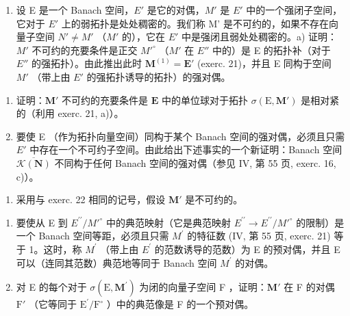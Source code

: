 \begin{enumerate}
\def\labelenumi{\arabic{enumi})}
\setcounter{enumi}{21}
\tightlist
\item
  设 E 是一个 Banach 空间，\(E'\) 是它的对偶，\(M'\) 是 \(E'\) 中的一个强闭子空间，它对于 \(E'\) 上的弱拓扑是处处稠密的。我们称 M' 是不可约的，如果不存在向量子空间 \(N' \neq M'\) （\(M'\) 的），它在 \(E'\) 中是强闭且弱处处稠密的。a) 证明：\(M'\) 不可约的充要条件是正交 \(M'^{\circ}\) （\(M'\) 在 \(E''\) 中的）是 E 的拓扑补（对于 \(E''\) 的强拓扑）。由此推出此时 \(\mathbf{M}^{(1)} = \mathbf{E}'\) (exerc. 21)，并且 E 同构于空间 \(M'\) （带上由 \(E'\) 的强拓扑诱导的拓扑）的强对偶。
\end{enumerate}

\begin{enumerate}
\def\labelenumi{\alph{enumi})}
\setcounter{enumi}{1}
\item
  证明：\(\mathbf{M}'\) 不可约的充要条件是 \(\mathbf{E}\) 中的单位球对于拓扑 \(\sigma (\mathrm{E},\mathbf{M}')\) 是相对紧的（利用 exerc. 21, a)）。
\item
  要使 E （作为拓扑向量空间）同构于某个 Banach 空间的强对偶，必须且只需 \(E'\) 中存在一个不可约子空间。由此给出下述事实的一个新证明：Banach 空间 \(\overline{\mathcal{K}(\mathbf{N})}\) 不同构于任何 Banach 空间的强对偶（参见 IV, 第 55 页, exerc. 16, c)）。
\end{enumerate}

\begin{enumerate}
\def\labelenumi{\arabic{enumi})}
\setcounter{enumi}{22}
\tightlist
\item
  采用与 exerc. 22 相同的记号，假设 \(\mathbf{M}'\) 是不可约的。
\end{enumerate}

\begin{enumerate}
\def\labelenumi{\alph{enumi})}
\item
  要使从 E 到 \(E^{\prime\prime}/M'^{\circ}\) 中的典范映射（它是典范映射 \(E^{\prime\prime} \rightarrow E^{\prime\prime}/M'^{\circ}\) 的限制）是一个 Banach 空间等距，必须且只需 \(M^{\prime}\) 的特征数 (IV, 第 55 页, exerc. 21) 等于 1。这时，称 \(M^{\prime}\) （带上由 \(E^{\prime}\) 的范数诱导的范数）为 E 的预对偶，并且 E 可以（连同其范数）典范地等同于 Banach 空间 \(M^{\prime}\) 的对偶。
\item
  对 E 的每个对于 \(\sigma (\mathrm{E},\mathbf{M}^{\prime})\) 为闭的向量子空间 F ，证明：\(\mathbf{M}'\) 在 F 的对偶 \(\mathrm{F}'\) （它等同于 \(\mathrm{E}^{\prime} / \mathrm{F}^{\circ}\) ）中的典范像是 F 的一个预对偶。
\end{enumerate}

